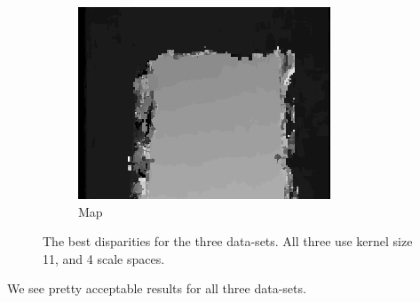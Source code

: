 \documentclass[12pt,a4paper,oneside,final]{article}
\begin{document}
\begin{figure}[H]
\begin{subfigure}[b]{0.32\textwidth}
	\includegraphics[width=\textwidth]{disparity_s4_k11set_3.png}
	\caption{Map}
\end{subfigure}
\caption{The best disparities for the three data-sets. All three use kernel size 11, and 4 scale spaces.}
\label{fig:lowlevel}
\end{figure}

We see pretty acceptable results for all three data-sets. 
	
\end{document}
